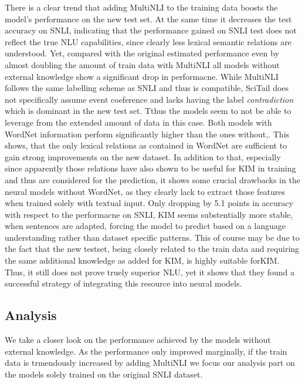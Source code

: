 There is a clear trend that adding \ac{MultiNLI} to the training data boosts the model's performance on the new test set. At the same time it decreases the test accuracy on SNLI, indicating that the performance gained on \ac{SNLI} test does not reflect the true \ac{NLU} capabilities, since clearly less lexical semantic relations are understood. Yet, compared with the original estimated performance even by almost doubling the amount of train data with \ac{MultiNLI} all models without external knowledge show a significant drop in performacne. While MultiNLI follows the same labelling scheme as SNLI and thus is compatible, SciTail does not specifically assume event coeference and lacks having the label \textit{contradiction} which is dominant in the new test set. Tthus the models seem to not be able to leverage from the extended amount of data in this case. Both models with WordNet information perform significantly higher than the ones without,. This shows, that the only lexical relations as contained in WordNet are sufficient to gain strong improvements on the new dataset. In addition to that, especially since apparently those relations have  also shown to be useful for \ac{KIM} in training and thus are considered for the prediction, it shows some crucial drawbacks in the neural models without WordNet, as they clearly lack to extract those features when trained solely with textual input. Only dropping by 5.1 points in accuracy with respect to the performacne on \ac{SNLI}, \ac{KIM} seems substentially more stable, when sentences are adapted, forcing the model to predict based on a language understanding rather than dataset specific patterns. This of course may be due to the fact that the new testset, being closely related to the train data and requiring the same additional knowledge as added for \ac{KIM}, is highly suitable for\ac{KIM}. Thus, it still does not prove truely superior \ac{NLU}, yet it shows that they found a successful strategy of integrating this resource into neural models.

\subsection{Analysis}
We take a closer look on the performance achieved by the models without external knowledge. As the performance only improved marginally, if the train data is trmendously increased by adding \ac{MultiNLI} we focus our analysis part on the models solely trained on the original \ac{SNLI} dataset.
